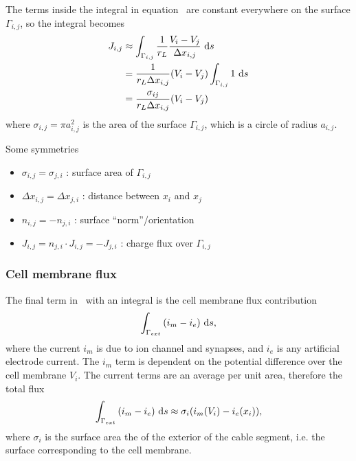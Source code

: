 The terms inside the integral in equation~ are constant everywhere on the surface $\Gamma_{i,j}$, so the integral becomes
\begin{align}
  J_{i,j} &\approx \int_{\Gamma_{i,j}}  \frac{1}{r_L}\frac{V_i-V_j}{\Delta x_{i,j}} ~\text{d}{s} \nonumber \\
          &= \frac{1}{r_L \Delta x_{i,j}}(V_i-V_j) \int_{\Gamma_{i,j}} 1 ~\text{d}{s} \nonumber \\
          &= \frac{\sigma_{ij}}{r_L \Delta x_{i,j}}(V_i-V_j) \nonumber \\
          \label{eq:J_ij}
\end{align}
where $\sigma_{i,j}=\pi a_{i,j}^2$ is the area of the surface $\Gamma_{i,j}$, which is a circle of radius $a_{i,j}$.

Some symmetries
\begin{itemize}
    \item $\sigma_{i,j}=\sigma_{j,i}$ : surface area of $\Gamma_{i,j}$
    \item $\Delta x_{i,j}=\Delta x_{j,i}$ : distance between $x_i$ and $x_j$
    \item $n_{i,j}=-n_{j,i}$ : surface ``norm''/orientation
    \item $J_{i,j}=n_{j,i}\cdot J_{i,j}=-J_{j,i}$ : charge flux over $\Gamma_{i,j}$
\end{itemize}

\subsubsection{Cell membrane flux}
The final term in~ with an integral is the cell membrane flux contribution
\begin{equation}
    \int_{\Gamma_{ext}} {(i_m - i_e)} ~\text{d}{s},
\end{equation}
where the current $i_m$ is due to ion channel and synapses, and $i_e$ is any artificial electrode current.
The $i_m$ term is dependent on the potential difference over the cell membrane $V_i$.
The current terms are an average per unit area, therefore the total flux 
\begin{equation}
    \int_{\Gamma_{ext}} {(i_m - i_e)} ~\text{d}{s}
        \approx
    \sigma_i(i_m(V_i) - i_e(x_i)),
        \label{eq:J_im}
\end{equation}
where $\sigma_i$ is the surface area the of the exterior of the cable segment, i.e. the surface corresponding to the cell membrane.


